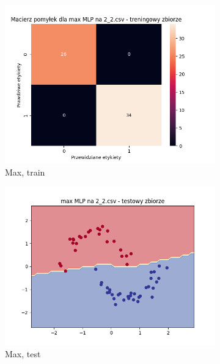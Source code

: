 \documentclass[12pt]{article}
\newcommand*{\subfigwidth}{0.24\textwidth}
\begin{document}
\begin{figure}[H]
\begin{subfigure}[t]{\subfigwidth}
        \includegraphics[width=\linewidth]{img/exp_3/mlp/2_2/max/train_matrix.png}
        \caption{Max, train}
    \end{subfigure}
    \hfill
    \begin{subfigure}[t]{\subfigwidth}
        \includegraphics[width=\linewidth]{img/exp_3/mlp/2_2/max/test_boundary.png}
        \caption{Max, test}
    \end{subfigure}
    \hfill
    \begin{subfigure}[t]{\subfigwidth}

\end{subfigure}
\end{figure}
\end{document}
